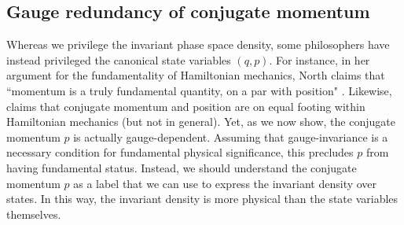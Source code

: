 \documentclass[letterpaper]{article}
\begin{document}


\subsection{Gauge redundancy of conjugate momentum}
\label{gauge_momentum}


Whereas we privilege the invariant phase space density, some philosophers have instead privileged the canonical state variables $(q, p)$. For instance, in her argument for the fundamentality of Hamiltonian mechanics, North claims that ``momentum is a truly fundamental quantity, on a par with position" \parencites*[77]{North}. Likewise, \textcites[164,171]{Wallace} claims that conjugate momentum and position are on equal footing within Hamiltonian mechanics (but not in general). Yet, as we now show, the conjugate momentum $p$ is actually gauge-dependent. Assuming that gauge-invariance is a necessary condition for fundamental physical significance, this precludes $p$ from having fundamental status. Instead, we should understand the conjugate momentum $p$ as a label that we can use to express the invariant density over states. In this way, the invariant density is more physical than the state variables themselves. 
\end{document}
